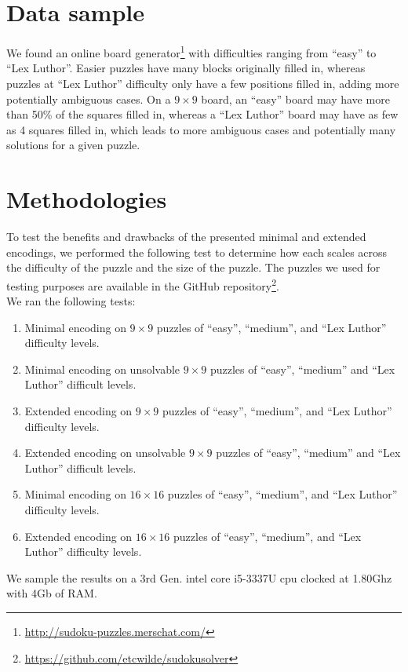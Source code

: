\documentclass[conference,draftclsnofoot]{IEEEtran}
\begin{document}
\section{Data sample}
We found an online board
generator\footnote{\url{http://sudoku-puzzles.merschat.com/}} with difficulties
ranging from ``easy'' to ``Lex Luthor''. Easier puzzles have many blocks
originally filled in, whereas puzzles at ``Lex Luthor'' difficulty only have a
few positions filled in, adding more potentially ambiguous cases. On a $9
\times 9$ board, an ``easy'' board may have more than 50\% of the squares
filled in, whereas a ``Lex Luthor'' board may have as few as 4 squares filled
in, which leads to more ambiguous cases and potentially many solutions for a
given puzzle.

\section{Methodologies}
To test the benefits and drawbacks of the presented minimal and extended
encodings, we performed the following test to determine how each scales across
the difficulty of the puzzle and the size of the puzzle. The puzzles we used
for testing purposes are available in the GitHub
repository\footnote{\url{https://github.com/etcwilde/sudokusolver}}.\\

We ran the following tests:
\begin{enumerate}
	\item Minimal encoding on $9 \times 9$ puzzles of ``easy'', ``medium'', and
		``Lex Luthor'' difficulty levels.
	\item Minimal encoding on unsolvable $9 \times 9$ puzzles of ``easy'',
		``medium'' and ``Lex Luthor'' difficult levels.
	\item Extended encoding on $9 \times 9$ puzzles of ``easy'', ``medium'', and
		``Lex Luthor'' difficulty levels.
	\item Extended encoding on unsolvable $9 \times 9$ puzzles of ``easy'',
		``medium'' and ``Lex Luthor'' difficult levels.
	\item Minimal encoding on $16 \times 16$ puzzles of
		``easy'', ``medium'', and ``Lex Luthor'' difficulty levels.
	\item Extended encoding	on $16 \times 16$ puzzles of
		``easy'', ``medium'', and ``Lex Luthor'' difficulty levels.
\end{enumerate}

We sample the results on a 3rd Gen. intel core i5-3337U cpu clocked at 1.80Ghz
with 4Gb of RAM.
\end{document}
